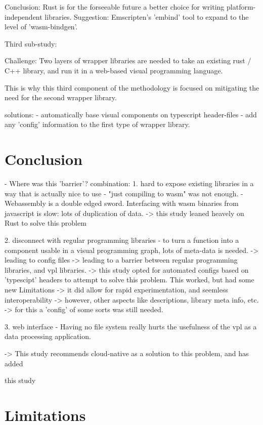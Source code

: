 Conclusion: 
Rust is for the forseeable future a better choice for writing platform-independent libraries. 
Suggestion: Emscripten's 'embind' tool to expand to the level of 'wasm-bindgen'.

Third sub-study: 

Challenge:
Two layers of wrapper libraries are needed to take an existing rust / C++ library, and run it in a web-based visual programming language.

This is why this third component of the methodology is focused on mitigating the need for the second wrapper library. 

solutions: 
- automatically base visual components on typescript header-files
- add any 'config' information to the first type of wrapper library. 

\section{Conclusion}

- Where was this 'barrier'?
combination: 
1. hard to expose existing libraries in a way that is actually nice to use
- "just compiling to wasm" was not enough.
- Webassembly is a double edged sword. Interfacing with wasm binaries from javascript is slow: lots of duplication of data. 
-> this study leaned heavely on Rust to solve this problem

2. disconnect with regular programming libraries
- to turn a function into a component usable in a visual programming graph, lots of meta-data is needed. 
  -> leading to config files 
  -> leading to a barrier between regular programming libraries, and vpl libraries. 
  -> this study opted for automated configs based on 'typescipt' headers to attempt to solve this problem. This worked, but had some new Limitations
     -> it did allow for rapid experimentation, and seemless interoperability
     -> however, other aspects like descriptions, library meta info, etc. 
     -> for this a 'config' of some sorts was still needed. 

3. web interface
- Having no file system really hurts the usefulness of the vpl as a data processing application.

-> This study recommends cloud-native as a solution to this problem, and has added 


this study 


\section{Limitations}

